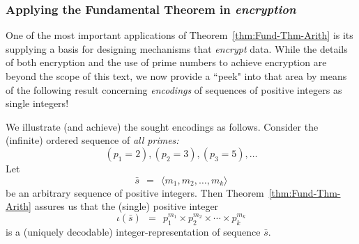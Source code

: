 \subsubsection{Applying the Fundamental Theorem in {\em encryption}}
\label{sec:apply-FTA}

One of the most important applications of Theorem~\ref{thm:Fund-Thm-Arith} is its supplying a basis for designing mechanisms that {\em encrypt} data.  While the details of both encryption and the use of prime numbers to achieve encryption are beyond the scope of this text, we now provide a ``peek" into that area by means of the following result concerning {\it encodings} of sequences of positive integers as single integers!

\bigskip

\noindent {}

\bigskip

We illustrate (and achieve) the sought encodings as follows.  Consider the (infinite) ordered sequence of {\em all primes:}
\[ (p_1 = 2), (p_2 = 3), (p_3 = 5), \ldots  \]
Let
\begin{equation}
\label{eq:sequence-vec-s}
\bar{s} \ \ = \ \ \langle m_1, m_2, \ldots, m_k \rangle
\end{equation}
be an arbitrary sequence of positive integers.  Then Theorem~\ref{thm:Fund-Thm-Arith} assures us that the (single) positive integer
\[  \iota(\bar{s}) \ \ = \ \ p_1^{m_1} \times p_2^{m_2} \times  \cdots \times p_k^{m_k} \]
is a (uniquely decodable) integer-representation of sequence $\bar{s}$.

